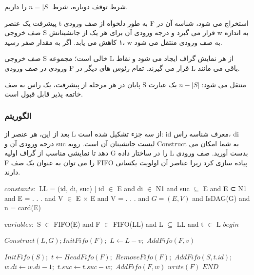 \documentclass{book} %
\begin{document}
شرط توقف
دوباره، شرط $n = |S|$ را داریم.

پیشرفت 
یک عنصر t به طور دلخواه از صف ورودی F استخراج می شود، شناسه آن در صف خروجی S قرار می گیرد و درجه ورودی آن برای هر یک از جانشینانش w به اندازه ۱ کاهش می یابد. اگر به مقدار صفر رسید، w به صف ورودی منتقل می شود.

صف خروجی S خالی است؛ مجموعه L از هر نمایش گراف ایجاد می شود و نقاط ورودی در صف ورودی F قرار می گیرند. تمام رئوس های دیگر در L باقی می مانند.

پایان 
در هر مرحله از پیشرفت، یک راس به صف S منتقل می شود: $n - |S|$ یک عبارت خاتمه پذیر قابل قبول است.

\subsubsection*{الگوریتم}

بعد از این، هر عنصر از L از سه جزء تشکیل شده است: id معرف شناسه راس، di درجه ورودی آن و suc لیست جانشینان آن است. رویه Construct به شما امکان می دهد تا نمایشی مناسب از گراف اولیه G را در ساختار داده L بدست آورید. صف ورودی F را می توان به عنوان یک صف FIFO پیاده سازی کرد زیرا عناصر آن اولویت یکسانی دارند.


\begin{latin}
    
    \begin{algorithm}
        \begin{algorithmic}
            \STATE $constants:$
            \STATE LL = {(id, di, suc) | id $\in$ E and di $\in$ N1 and suc $\subseteq$ E} and
            \STATE E ⊂ N1 and E = {. . .} and V $\in$ E $\times$ E and V = {. . .} and
            \STATE $G = (E, V)$ and IsDAG(G) and n = card(E)

            \STATE $variables:$
            \STATE S $\in$ FIFO(E) and F $\in$ FIFO(LL) and L $\subseteq$ LL and t $\in$ L
            \STATE $begin$

            \STATE $Construct(L, G); InitFifo(F);$
                    \STATE $L \leftarrow L - {v};$
                    \STATE $AddFifo(F, v)$
                \ENDIF
            \ENDFOR
            
            \STATE $InitFifo(S);$
                \STATE $t \leftarrow HeadFifo(F);$
                \STATE $RemoveFifo(F);$
                \STATE $AddFifo(S, t.id);$
                    \STATE $w.di \leftarrow w.di - 1;$
                        \STATE $t.suc \leftarrow t.suc - {w};$
                        \STATE $AddFifo(F, w)$
                    \ENDIF
                \ENDFOR
            \ENDWHILE
            \STATE $write(F)$
            \STATE $END$
        \end{algorithmic}
    \end{algorithm}
        
\end{latin}
\end{document}

